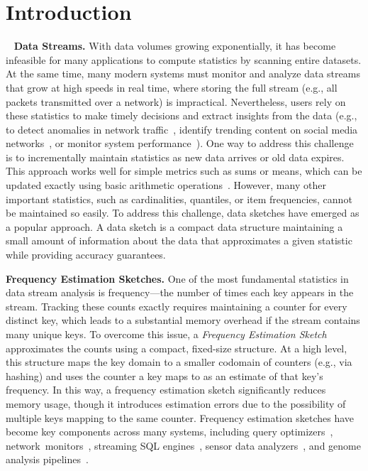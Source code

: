 \documentclass[sigconf]{acmart}
\begin{document}
\section{Introduction}~\label{sec:introduction}
\textbf{Data Streams.}
With data volumes growing exponentially, it has become infeasible for many
applications to compute statistics by scanning entire datasets. At the same
time, many modern systems must monitor and analyze data streams that grow at
high speeds in real time, where storing the full stream (e.g., all packets
transmitted over a network) is impractical. Nevertheless, users rely on these
statistics to make timely decisions and extract insights from the data (e.g.,
to detect anomalies in network
traffic~\cite{NetworkAnomalyDetection1,NetworkAnomalyDetection2}, identify
trending content on social media networks~\cite{ScoutSketch}, or monitor system
performance~\cite{OctoSketch,Canopy}). One way to address this challenge is to
incrementally maintain statistics as new data arrives or old data expires. This
approach works well for simple metrics such as sums or means, which can be
updated exactly using basic arithmetic operations~\cite{Canopy}. However, many
other important statistics, such as cardinalities, quantiles, or item
frequencies, cannot be maintained so easily. To address this challenge, data
sketches have emerged as a popular approach. A data sketch is a compact data
structure maintaining a small amount of information about the data that
approximates a given statistic while providing accuracy guarantees.

\textbf{Frequency Estimation Sketches.}
One of the most fundamental statistics in data stream analysis is frequency---the number of times each key appears in the stream.
Tracking these counts exactly requires maintaining a counter for every distinct key, which leads to a substantial memory overhead if the stream contains many unique keys.
To overcome this issue, a \emph{Frequency Estimation Sketch} approximates the counts using a compact, fixed-size structure.
At a high level, this structure maps the key domain to a smaller codomain of counters (e.g., via hashing) and uses the counter a key maps to as an estimate of that key's frequency.
In this way, a frequency estimation sketch significantly reduces memory usage, though it introduces estimation errors due to the possibility of multiple keys mapping to the same counter.
Frequency estimation sketches have become key components across many systems, including query optimizers~\cite{Compass,QueryOptimizationSketches,ConvolutionSketch}, network~monitors~\cite{SketchBasedChangeDetection,WhatsNew,SketchingStreamsNet,TrafficManagementSurvey,RandomizedAdmissionEstimation,Blink,LOFT}, streaming SQL engines~\cite{Flink}, sensor data analyzers~\cite{SensorDataAnalytics,RobustAggregationSensorNetworks}, and genome analysis pipelines~\cite{CMSkmer,SetMinSketch}.
\end{document}
